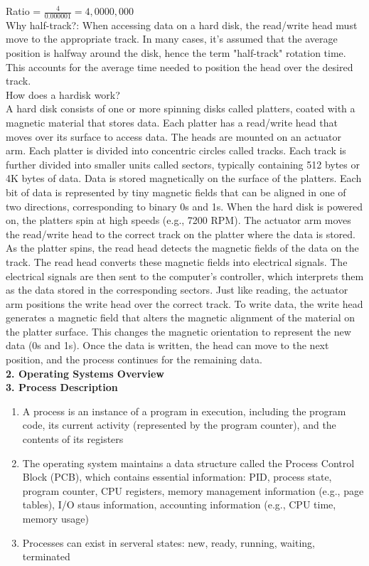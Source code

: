 \documentclass{article}
\begin{document}
Ratio = $\frac{4}{0.000001} = 4,0000,000$\\

Why half-track?: When accessing data on a hard disk, the read/write head must move to the appropriate track. In many cases, it’s assumed that the average position is halfway around the disk, hence the term "half-track" rotation time. This accounts for the average time needed to position the head over the desired track.\\

How does a hardisk work?\\
A hard disk consists of one or more spinning disks called platters, coated with a magnetic material that stores data. Each platter has a read/write head that moves over its surface to access data. The heads are mounted on an actuator arm. Each platter is divided into concentric circles called tracks. Each track is further divided into smaller units called sectors, typically containing 512 bytes or 4K bytes of data. Data is stored magnetically on the surface of the platters. Each bit of data is represented by tiny magnetic fields that can be aligned in one of two directions, corresponding to binary 0s and 1s. When the hard disk is powered on, the platters spin at high speeds (e.g., 7200 RPM). The actuator arm moves the read/write head to the correct track on the platter where the data is stored. As the platter spins, the read head detects the magnetic fields of the data on the track. The read head converts these magnetic fields into electrical signals. The electrical signals are then sent to the computer's controller, which interprets them as the data stored in the corresponding sectors. Just like reading, the actuator arm positions the write head over the correct track. To write data, the write head generates a magnetic field that alters the magnetic alignment of the material on the platter surface. This changes the magnetic orientation to represent the new data (0s and 1s). Once the data is written, the head can move to the next position, and the process continues for the remaining data.\\

\textbf{2. Operating Systems Overview}\\

\textbf{3. Process Description}
\begin{enumerate}
\item A process is an instance of a program in execution, including the program code, its current activity (represented by the program counter), and the contents of its registers
\item The operating system maintains a data structure called the Process Control Block (PCB), which contains essential information: PID, process state, program counter, CPU registers, memory management information (e.g., page tables), I/O staus information, accounting information (e.g., CPU time, memory usage)
\item Processes can exist in serveral states: new, ready, running, waiting, terminated
\end{enumerate}
\end{document}
